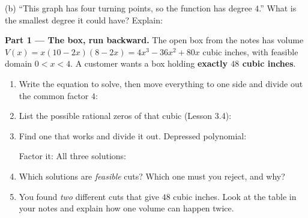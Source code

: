 \documentclass[10pt]{article}
\begin{document}
\begin{tcolorbox}[colback=white, colframe=black!40, title=\textbf{Tier A --- Approaching Proficiency},
    fonttitle=\bfseries, arc=1.5mm, left=3mm, right=3mm, top=2mm, bottom=2mm, breakable]
\begin{enumerate}[leftmargin=1.7em, itemsep=10pt]
    \vspace{2pt}
    (b) ``This graph has four turning points, so the function has degree $4$.''
    What is the smallest degree it could have?  \; Explain: 
\end{enumerate}
\end{tcolorbox}

\begin{tcolorbox}[colback=white, colframe=black!40, title=\textbf{Tier E --- Extension},
    fonttitle=\bfseries, arc=1.5mm, left=3mm, right=3mm, top=2mm, bottom=2mm, breakable]
\textbf{Part 1 --- The box, run backward.} The open box from the notes has volume
$V(x) = x(10-2x)(8-2x) = 4x^3 - 36x^2 + 80x$ cubic inches, with feasible domain $0 < x < 4$. A
customer wants a box holding \textbf{exactly $48$ cubic inches}.
\begin{enumerate}[label=(\alph*), leftmargin=1.8em, itemsep=6pt]
  \item Write the equation to solve, then move everything to one side and divide out the common
        factor $4$: \; 
  \item List the possible rational zeros of that cubic (Lesson 3.4): 
  \item Find one that works and divide it out. Depressed polynomial: 

        \vspace{2pt}
        Factor it:  \; All three solutions: 
  \item Which solutions are \emph{feasible} cuts?  \; Which one must you reject, and
        why? 
  \item You found \emph{two} different cuts that give $48$ cubic inches. Look at the table in your
        notes and explain how one volume can happen twice. 
\end{enumerate}


\end{tcolorbox}
\end{document}
